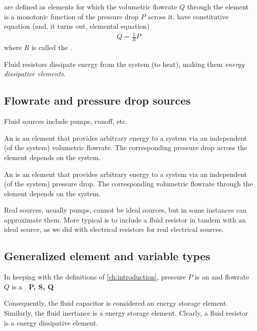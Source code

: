 \documentclass[dynamic_systems.tex]{subfiles}
\begin{document}
 are defined as elements for which the volumetric flowrate $Q$ through the element is a monotonic function of the pressure drop $P$ across it.
 have constitutive equation (and, it turns out, elemental equation)
\begin{align}
	Q = \frac{1}{R} P
\end{align}
where $R$ is called the .

Fluid resistors dissipate energy from the system (to heat), making them \emph{energy dissipative elements}.

\subsection{Flowrate and pressure drop sources}

Fluid sources include pumps, runoff, etc.
\tags{}

An  is an element that provides arbitrary energy to a system via an independent (of the system) volumetric flowrate.
The corresponding pressure drop across the element depends on the system.
\tags{}

An  is an element that provides arbitrary energy to a system via an independent (of the system) pressure drop.
The corresponding volumetric flowrate through the element depends on the system.
\tags{}

Real sources, usually pumps, cannot be ideal sources, but in some instances can approximate them.
More typical is to include a fluid resistor in tandem with an ideal source, as we did with electrical resistors for real electrical sources.

\subsection{Generalized element and variable types}
\tags{}

In keeping with the definitions of \cref{ch:introduction}, pressure $P$ is an  and flowrate $Q$ is a .
\textbf{P, S, Q}

Consequently, the fluid capacitor is considered an  energy storage element.
Similarly, the fluid inertance is a  energy storage element.
Clearly, a fluid resistor is a  energy dissipative element.
\end{document}
